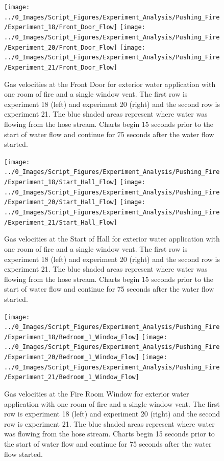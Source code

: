 \documentclass[12pt,oneside]{book}
\begin{document}
\begin{figure}[H]
\centering
\texttt{[image: ../0\_Images/Script\_Figures/Experiment\_Analysis/Pushing\_Fire/Experiment\_18/Front\_Door\_Flow]}
\texttt{[image: ../0\_Images/Script\_Figures/Experiment\_Analysis/Pushing\_Fire/Experiment\_20/Front\_Door\_Flow]}
\texttt{[image: ../0\_Images/Script\_Figures/Experiment\_Analysis/Pushing\_Fire/Experiment\_21/Front\_Door\_Flow]}
\caption[Gas Velocities - Single Room of Fire - Exterior]{Gas velocities at the Front Door for exterior water application with one room of fire and a single window vent. The first row is experiment 18 (left) and experiment 20 (right) and the second row is experiment 21. The blue shaded areas represent where water was flowing from the hose stream. Charts begin 15 seconds prior to the start of water flow and continue for 75 seconds after the water flow started.}
\label{fig:push_fire_exterior_Front_Door}
\end{figure}

\begin{figure}[H]
\centering
\texttt{[image: ../0\_Images/Script\_Figures/Experiment\_Analysis/Pushing\_Fire/Experiment\_18/Start\_Hall\_Flow]}
\texttt{[image: ../0\_Images/Script\_Figures/Experiment\_Analysis/Pushing\_Fire/Experiment\_20/Start\_Hall\_Flow]}
\texttt{[image: ../0\_Images/Script\_Figures/Experiment\_Analysis/Pushing\_Fire/Experiment\_21/Start\_Hall\_Flow]}
\caption[Gas Velocities - Single Room of Fire - Exterior]{Gas velocities at the Start of Hall for exterior water application with one room of fire and a single window vent. The first row is experiment 18 (left) and experiment 20 (right) and the second row is experiment 21. The blue shaded areas represent where water was flowing from the hose stream. Charts begin 15 seconds prior to the start of water flow and continue for 75 seconds after the water flow started.}
\label{fig:push_fire_exterior_Start_Hall}
\end{figure}

\begin{figure}[H]
\centering
\texttt{[image: ../0\_Images/Script\_Figures/Experiment\_Analysis/Pushing\_Fire/Experiment\_18/Bedroom\_1\_Window\_Flow]}
\texttt{[image: ../0\_Images/Script\_Figures/Experiment\_Analysis/Pushing\_Fire/Experiment\_20/Bedroom\_1\_Window\_Flow]}
\texttt{[image: ../0\_Images/Script\_Figures/Experiment\_Analysis/Pushing\_Fire/Experiment\_21/Bedroom\_1\_Window\_Flow]}
\caption[Gas Velocities - Single Room of Fire - Exterior]{Gas velocities at the Fire Room Window for exterior water application with one room of fire and a single window vent. The first row is experiment 18 (left) and experiment 20 (right) and the second row is experiment 21. The blue shaded areas represent where water was flowing from the hose stream. Charts begin 15 seconds prior to the start of water flow and continue for 75 seconds after the water flow started.}
\label{fig:push_fire_exterior_Fire_Room}
\end{figure}
\end{document}
